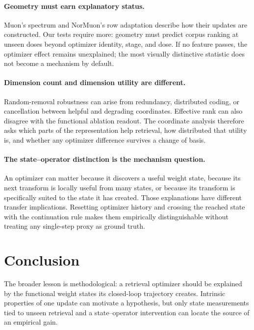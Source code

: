 \documentclass[11pt]{article}
\begin{document}
\paragraph{Geometry must earn explanatory status.}
Muon's spectrum and NorMuon's row adaptation describe how their updates are constructed. Our
tests require more: geometry must predict corpus ranking at unseen doses beyond optimizer identity,
stage, and dose. If no feature passes, the optimizer effect remains unexplained; the most visually
distinctive statistic does not become a mechanism by default.

\paragraph{Dimension count and dimension utility are different.}
Random-removal robustness can arise from redundancy, distributed coding, or cancellation between
helpful and degrading coordinates. Effective rank can also disagree with the functional ablation
readout. The coordinate analysis therefore asks which parts of the representation help retrieval,
how distributed that utility is, and whether any optimizer difference survives a change of basis.

\paragraph{The state--operator distinction is the mechanism question.}
An optimizer can matter because it discovers a useful weight state, because its next transform is
locally useful from many states, or because its transform is specifically suited to the state it has
created. Those explanations have different transfer implications. Resetting optimizer history and
crossing the reached state with the continuation rule makes them empirically distinguishable without
treating any single-step proxy as ground truth.

\FloatBarrier

\section{Conclusion}

\CorrectedConclusionFinding

\DimensionConclusionFinding

\StateOperatorConclusionFinding

The broader lesson is methodological: a retrieval optimizer should be explained by the functional
weight states its closed-loop trajectory creates. Intrinsic properties of one update can motivate a
hypothesis, but only state measurements tied to unseen retrieval and a state--operator intervention
can locate the source of an empirical gain.
\end{document}
